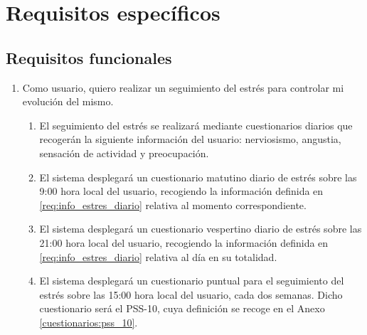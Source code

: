 \section{Requisitos específicos}
    \label{req:especificos}

    \subsection{Requisitos funcionales}
        \label{req:especificos:funcionales}



        \begin{enumerate}[series=req-usuario,label=\textbf{\texttt{RU-\arabic*}}]
            \item Como usuario, quiero realizar un seguimiento del estrés para controlar mi evolución del mismo.
            \begin{enumerate}[series=req-funcionales,label=\textbf{\texttt{RF-\arabic*}}]
                \item \label{req:info_estres_diario} El seguimiento del estrés se realizará mediante cuestionarios diarios que recogerán la siguiente información del usuario: nerviosismo, angustia, sensación de actividad y preocupación.
                \item El sistema desplegará un cuestionario matutino diario de estrés sobre las 9:00 hora local del usuario, recogiendo la información definida en \ref{req:info_estres_diario} relativa al momento correspondiente.
                \item  El sistema desplegará un cuestionario vespertino diario de estrés sobre las 21:00 hora local del usuario, recogiendo la información definida en \ref{req:info_estres_diario} relativa al día en su totalidad.                
                \item El sistema desplegará un cuestionario puntual para el seguimiento del estrés sobre las 15:00 hora local del usuario, cada dos semanas. Dicho cuestionario será el PSS-10, cuya definición se recoge en el Anexo \ref{cuestionarios:pss_10}.

\end{enumerate}
\end{enumerate}

